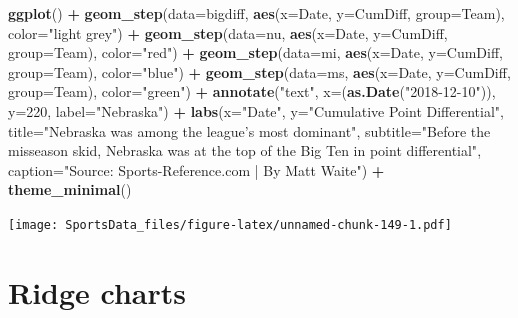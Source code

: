 \documentclass[]{book}
\newenvironment{Shaded}{\begin{snugshade}}{\end{snugshade}}
\newcommand{\DataTypeTok}[1]{\textcolor[rgb]{0.13,0.29,0.53}{#1}}
\newcommand{\DecValTok}[1]{\textcolor[rgb]{0.00,0.00,0.81}{#1}}
\newcommand{\KeywordTok}[1]{\textcolor[rgb]{0.13,0.29,0.53}{\textbf{#1}}}
\newcommand{\NormalTok}[1]{#1}
\newcommand{\OperatorTok}[1]{\textcolor[rgb]{0.81,0.36,0.00}{\textbf{#1}}}
\newcommand{\StringTok}[1]{\textcolor[rgb]{0.31,0.60,0.02}{#1}}
\begin{document}
\begin{Shaded}
\begin{Highlighting}[]
\KeywordTok{ggplot}\NormalTok{() }\OperatorTok{+}\StringTok{ }
\StringTok{  }\KeywordTok{geom_step}\NormalTok{(}\DataTypeTok{data=}\NormalTok{bigdiff, }\KeywordTok{aes}\NormalTok{(}\DataTypeTok{x=}\NormalTok{Date, }\DataTypeTok{y=}\NormalTok{CumDiff, }\DataTypeTok{group=}\NormalTok{Team), }\DataTypeTok{color=}\StringTok{"light grey"}\NormalTok{) }\OperatorTok{+}
\StringTok{  }\KeywordTok{geom_step}\NormalTok{(}\DataTypeTok{data=}\NormalTok{nu, }\KeywordTok{aes}\NormalTok{(}\DataTypeTok{x=}\NormalTok{Date, }\DataTypeTok{y=}\NormalTok{CumDiff, }\DataTypeTok{group=}\NormalTok{Team), }\DataTypeTok{color=}\StringTok{"red"}\NormalTok{) }\OperatorTok{+}\StringTok{ }
\StringTok{  }\KeywordTok{geom_step}\NormalTok{(}\DataTypeTok{data=}\NormalTok{mi, }\KeywordTok{aes}\NormalTok{(}\DataTypeTok{x=}\NormalTok{Date, }\DataTypeTok{y=}\NormalTok{CumDiff, }\DataTypeTok{group=}\NormalTok{Team), }\DataTypeTok{color=}\StringTok{"blue"}\NormalTok{) }\OperatorTok{+}\StringTok{ }
\StringTok{  }\KeywordTok{geom_step}\NormalTok{(}\DataTypeTok{data=}\NormalTok{ms, }\KeywordTok{aes}\NormalTok{(}\DataTypeTok{x=}\NormalTok{Date, }\DataTypeTok{y=}\NormalTok{CumDiff, }\DataTypeTok{group=}\NormalTok{Team), }\DataTypeTok{color=}\StringTok{"green"}\NormalTok{) }\OperatorTok{+}
\StringTok{  }\KeywordTok{annotate}\NormalTok{(}\StringTok{"text"}\NormalTok{, }\DataTypeTok{x=}\NormalTok{(}\KeywordTok{as.Date}\NormalTok{(}\StringTok{"2018-12-10"}\NormalTok{)), }\DataTypeTok{y=}\DecValTok{220}\NormalTok{, }\DataTypeTok{label=}\StringTok{"Nebraska"}\NormalTok{) }\OperatorTok{+}
\StringTok{  }\KeywordTok{labs}\NormalTok{(}\DataTypeTok{x=}\StringTok{"Date"}\NormalTok{, }\DataTypeTok{y=}\StringTok{"Cumulative Point Differential"}\NormalTok{, }\DataTypeTok{title=}\StringTok{"Nebraska was among the league's most dominant"}\NormalTok{, }\DataTypeTok{subtitle=}\StringTok{"Before the misseason skid, Nebraska was at the top of the Big Ten in point differential"}\NormalTok{, }\DataTypeTok{caption=}\StringTok{"Source: Sports-Reference.com | By Matt Waite"}\NormalTok{) }\OperatorTok{+}
\StringTok{  }\KeywordTok{theme_minimal}\NormalTok{()}
\end{Highlighting}
\end{Shaded}

\texttt{[image: SportsData\_files/figure-latex/unnamed-chunk-149-1.pdf]}

\hypertarget{ridge-charts}{%
\chapter{Ridge charts}\label{ridge-charts}}
\end{document}
